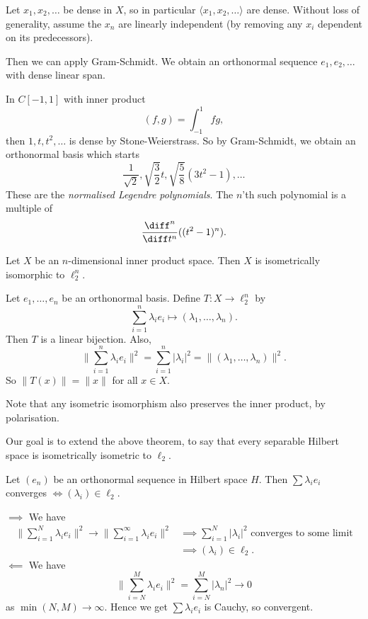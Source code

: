\documentclass[12pt]{article}
\begin{document}
\begin{proofbox}
	Let $x_1, x_2, \ldots$ be dense in $X$, so in particular $\langle x_1, x_2, \ldots\rangle$ are dense. Without loss of generality, assume the $x_n$ are linearly independent (by removing any $x_i$ dependent on its predecessors).

	Then we can apply Gram-Schmidt. We obtain an orthonormal sequence $e_1, e_2, \ldots$ with dense linear span.
\end{proofbox}

\begin{exbox}
	In $C[-1, 1]$ with inner product
	\[
		(f, g) = \int_{-1}^1 fg,
	\]
	then $1, t, t^2, \ldots$ is dense by Stone-Weierstrass. So by Gram-Schmidt, we obtain an orthonormal basis which starts
	\[
		\frac{1}{\sqrt 2}, \sqrt{\frac{3}{2}} t, \sqrt{\frac{5}{8}}(3t^2 - 1), \ldots
	\]
	These are the \emph{normalised Legendre polynomials}. The $n$'th such polynomial is a multiple of
	\[
	\frac{\diff^n}{\diff t^n} ((t^2 - 1)^n).
	\]
\end{exbox}

\begin{corollary}
	Let $X$ be an $n$-dimensional inner product space. Then $X$ is isometrically isomorphic to $\ell_2^n$.
\end{corollary}

\begin{proofbox}
	Let $e_1, \ldots, e_n$ be an orthonormal basis. Define $T : X \to \ell_2^n$ by
	\[
	\sum_{i = 1}^{n} \lambda_i e_i \mapsto (\lambda_1, \ldots, \lambda_n).
	\]
	Then $T$ is a linear bijection. Also,
	\[
	\biggl\|\sum_{i = 1}^{n} \lambda_i e_i\biggr\|^2 = \sum_{i = 1}^{n} |\lambda_i|^2 = \|(\lambda_1, \ldots, \lambda_n)\|^2.
	\]
	So $\|T(x)\| = \|x\|$ for all $x \in X$.
\end{proofbox}

Note that any isometric isomorphism also preserves the inner product, by polarisation.

Our goal is to extend the above theorem, to say that every separable Hilbert space is isometrically isometric to $\ell_2$.

\begin{proposition}
	Let $(e_n)$ be an orthonormal sequence in Hilbert space $H$. Then $\sum \lambda_i e_i$ converges $\iff (\lambda_i) \in \ell_2$.
\end{proposition}

\begin{proofbox}


	$\implies$ We have
	\begin{align*}
		\biggl\|\sum_{i = 1}^{N} \lambda_i e_i\biggr\|^2  \to \biggl\|\sum_{i = 1}^{\infty} \lambda_i e_i\biggr\|^2 &\implies \sum_{i = 1}^{N} |\lambda_i|^2 \text{ converges to some limit} \\
															    &\implies (\lambda_i) \in \ell_2.
	\end{align*}
	$\impliedby$ We have
	\[
	\biggl\|\sum_{i = N}^{M} \lambda_i e_i\biggr\|^2 = \sum_{i = N}^{M} |\lambda_n|^2 \to 0
	\]
	as $\min(N, M) \to \infty$. Hence we get $\sum \lambda_i e_i$ is Cauchy, so convergent.
\end{proofbox}
\end{document}
